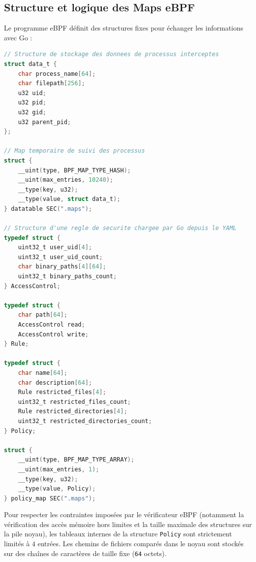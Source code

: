 \documentclass[11pt,a4paper]{article}
\begin{document}
\subsection{Structure et logique des Maps eBPF}
Le programme eBPF définit des structures fixes pour échanger les informations avec Go :
\begin{lstlisting}[language=C, caption=Structures et definitions des maps eBPF dans main.ebpf.c]
// Structure de stockage des donnees de processus interceptes
struct data_t {
    char process_name[64];
    char filepath[256];
    u32 uid;
    u32 pid;
    u32 gid;
    u32 parent_pid;
};

// Map temporaire de suivi des processus
struct {
    __uint(type, BPF_MAP_TYPE_HASH);
    __uint(max_entries, 10240);
    __type(key, u32);
    __type(value, struct data_t);
} datatable SEC(".maps");

// Structure d'une regle de securite chargee par Go depuis le YAML
typedef struct {
    uint32_t user_uid[4];
    uint32_t user_uid_count;
    char binary_paths[4][64];
    uint32_t binary_paths_count;
} AccessControl;

typedef struct {
    char path[64];
    AccessControl read;
    AccessControl write;
} Rule;

typedef struct {
    char name[64];
    char description[64];
    Rule restricted_files[4];
    uint32_t restricted_files_count;
    Rule restricted_directories[4];
    uint32_t restricted_directories_count;
} Policy;

struct {
    __uint(type, BPF_MAP_TYPE_ARRAY);
    __uint(max_entries, 1);
    __type(key, u32);
    __type(value, Policy);
} policy_map SEC(".maps");
\end{lstlisting}
Pour respecter les contraintes imposées par le vérificateur eBPF (notamment la vérification des accès mémoire hors limites et la taille maximale des structures sur la pile noyau), les tableaux internes de la structure \texttt{Policy} sont strictement limités à $4$ entrées. Les chemins de fichiers comparés dans le noyau sont stockés sur des chaînes de caractères de taille fixe (\texttt{64} octets).
\end{document}
